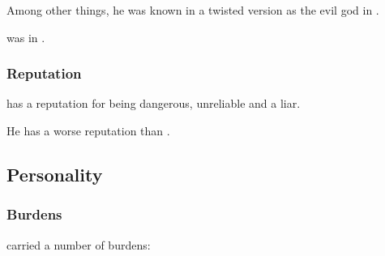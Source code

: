 Among other things, he was known in a twisted version as the evil god  in .

\Ishnaruchaefir was  in .





\subsubsection{Reputation}
\Ishnaruchaefir{} has a reputation for being dangerous, unreliable and a liar. 

He has a worse reputation than . 










\subsection{Personality}





\subsubsection{Burdens}
\Ishnaruchaefir carried a number of burdens:

